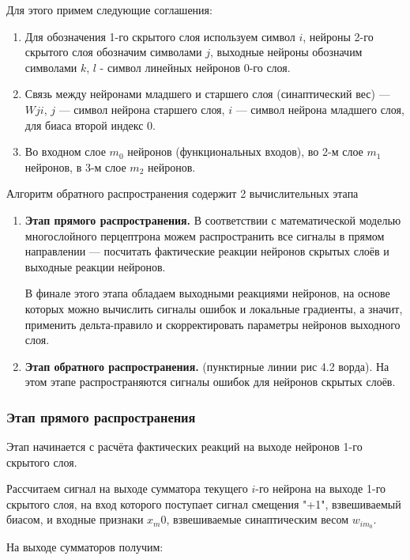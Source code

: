 \documentclass{article}
\begin{document}
Для этого примем следующие соглашения:
\begin{enumerate}
    \item Для обозначения 1-го скрытого слоя используем символ $i$, нейроны 2-го скрытого слоя 
    обозначим символами $j$, выходные нейроны обозначим символами $k$, $l$ - символ линейных 
    нейронов 0-го слоя.
    \item Связь между нейронами младшего и старшего слоя (синаптический вес) --- $W{ji}$, 
    $j$ --- символ нейрона старшего слоя, $i$ --- символ нейрона младшего слоя, 
    для биаса второй индекс $0$.
    \item Во входном слое $m_0$ нейронов (функциональных входов), во 2-м слое 
    $m_1$ нейронов, в 3-м слое $m_2$ нейронов.
\end{enumerate}

Алгоритм обратного распространения содержит 2 вычислительных этапа
\begin{enumerate}
    \item \textbf{Этап прямого распространения.} В соответствии с математической моделью многослойного 
    перцептрона можем распространить все сигналы в прямом направлении --- посчитать фактические 
    реакции нейронов скрытых слоёв и выходные реакции нейронов. 
    
    В финале этого этапа обладаем выходными реакциями нейронов, на основе которых можно 
    вычислить сигналы ошибок и локальные градиенты, а значит, применить дельта-правило 
    и скорректировать параметры нейронов выходного слоя.
    \item \textbf{Этап обратного распространения.} (пунктирные линии рис 4.2 ворда). 
    На этом этапе распространяются сигналы ошибок для нейронов скрытых слоёв.
\end{enumerate}



\subsubsection{Этап прямого распространения}

Этап начинается с расчёта фактических реакций на выходе нейронов 1-го скрытого слоя. 

Рассчитаем сигнал на выходе сумматора текущего $i$-го нейрона на выходе 1-го скрытого слоя, 
на вход которого  поступает сигнал смещения "+1", взвешиваемый биасом, и входные признаки 
$x_m0$, взвешиваемые синаптическим весом $w_{im_0}$.

На выходе сумматоров получим:
\end{document}
